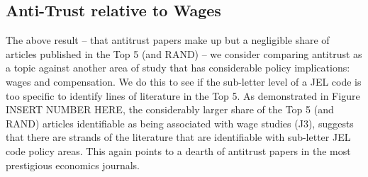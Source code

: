 \documentclass[11pt, letterpaper, twoside]{article}
\begin{document}
\subsection{Anti-Trust relative to Wages}
The above result -- that antitrust papers make up but a negligible share of articles published in the Top 5 (and RAND) -- we consider comparing antitrust as a topic against another area of study that has considerable policy implications: wages and compensation. We do this to see if the sub-letter level of a JEL code is too specific to identify lines of literature in the Top 5. As demonstrated in Figure INSERT NUMBER HERE, the considerably larger share of the Top 5 (and RAND) articles identifiable as being associated with wage studies (J3), suggests that there are strands of the literature that are identifiable with sub-letter JEL code policy areas. This again points to a dearth of antitrust papers in the most prestigious economics journals.
\end{document}
